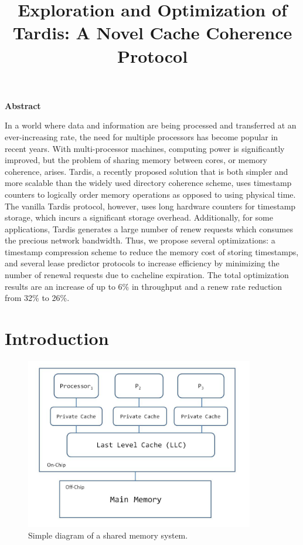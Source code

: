 \documentclass[12pt]{article}
\title{Exploration and Optimization of Tardis: A Novel Cache Coherence Protocol}
\date{}
\begin{document}
	\maketitle
	\begin{center}
		\textbf{Abstract}
	\end{center}
	
	\justify
	In a world where data and information are being processed and transferred at an ever-increasing rate, the need for multiple processors has become popular in recent years. With multi-processor machines, computing power is significantly improved, but the problem of sharing memory between cores, or memory coherence, arises. Tardis, a recently proposed solution that is both simpler and more scalable than the widely used directory coherence scheme, uses timestamp counters to logically order memory operations as opposed to using physical time. The vanilla Tardis protocol, however, uses long hardware counters for timestamp storage, which incurs a significant storage overhead. Additionally, for some applications, Tardis generates a large number of renew requests which consumes the precious network bandwidth. Thus, we propose several optimizations: a timestamp compression scheme to reduce the memory cost of storing timestamps, and several lease predictor protocols to increase efficiency by minimizing the number of renewal requests due to cacheline expiration. The total optimization results are an increase of up to 6\% in throughput and a renew rate reduction from 32\% to 26\%.
	
	
	
	\section{Introduction}
	
	\begin{figure}
		\begin{center}
			\includegraphics[width=10cm]{distributed_system.JPG}
			\caption{Simple diagram of a shared memory system.}
			\label{fig:distributed}
		\end{center}
	\end{figure}
	
\end{document}
